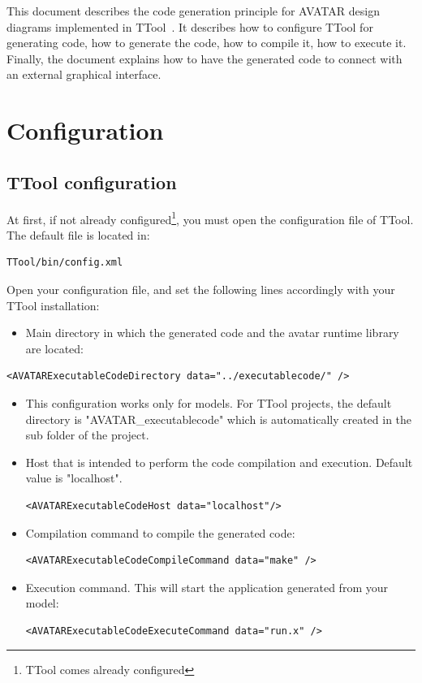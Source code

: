 \documentclass[12pt]{article}
\begin{document}
This document describes the code generation principle for AVATAR design diagrams implemented in TTool~\cite{ttool}. It describes how to configure TTool for generating code, how to generate the code, how to compile it, how to execute it.
Finally, the document explains how to have the generated code to connect with an external graphical interface.

\newpage

\section{Configuration}\label{sec:conf}
\subsection{TTool configuration}
At first, if not already configured\footnote{TTool comes already configured}, you must open the configuration file of TTool. The default file is located in:
\begin{verbatim}
TTool/bin/config.xml
\end{verbatim}
Open your configuration file, and set the following lines accordingly with your TTool installation:
\begin{itemize}
\item Main directory in which the generated code and the avatar runtime library are located:
\end{itemize}
\begin{verbatim}
<AVATARExecutableCodeDirectory data="../executablecode/" />
\end{verbatim}
\begin{itemize}
\item This configuration works only for models. For TTool projects, the default directory is "AVATAR\_executablecode" which is automatically created in the sub folder of the project.
\item Host that is intended to perform the code compilation and execution. Default value is "localhost".
\begin{verbatim}
<AVATARExecutableCodeHost data="localhost"/>
\end{verbatim}
\item Compilation command to compile the generated code:
\begin{verbatim}
<AVATARExecutableCodeCompileCommand data="make" />
\end{verbatim}
\item Execution command. This will start the application generated from your model:
\begin{verbatim}
<AVATARExecutableCodeExecuteCommand data="run.x" />
\end{verbatim}
\end{itemize}
\end{document}
